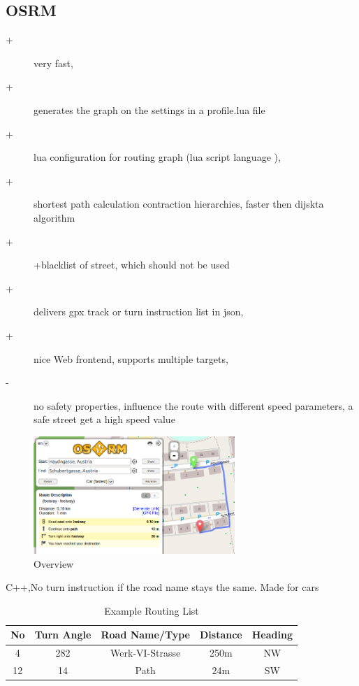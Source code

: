 \documentclass{sig-alternate}
\begin{document}



\subsection{OSRM}

\begin{description}
\item[+]very fast, 
\item[+]generates the graph on the settings in a profile.lua file
\item[+]lua configuration for routing graph (lua script language ), 
\item[+]shortest path calculation contraction hierarchies, faster then dijskta algorithm
\item[+]+blacklist of street, which should not be used
\item[+]delivers gpx track or turn instruction list in json,
\item[+]nice Web frontend, supports multiple targets,
\item[-] no safety properties, influence the route with different speed parameters, a safe street get a high speed value
\end{description}

\begin{figure}
\centering
\includegraphics[width=3in]{osrm-ss.png}
\caption{Overview}
\end{figure}

C++,No turn instruction if the road name stays the same. Made for cars


\begin{table}
\centering
\caption{Example Routing List}
\begin{tabular}{|c|c|c|c|c|} \hline
No&Turn Angle&Road Name/Type&Distance&Heading\\ \hline
4&282&Werk-VI-Strasse&250m&NW\\ \hline
12&14&Path&24m&SW\\ \hline
\end{tabular}
\end{table}
\end{document}
